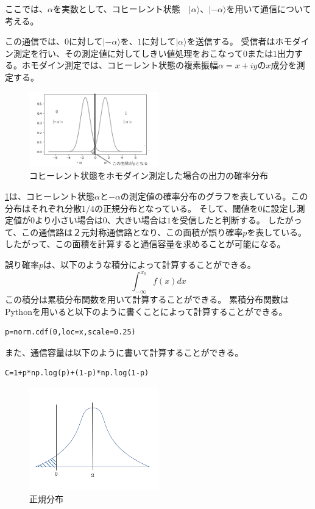 \documentclass[a4j,twocolumn]{jarticle}
\def \figref #1{\figurename\ref{#1}}
\begin{document}
ここでは、$\alpha$を実数として、コヒーレント状態　$|\alpha\rangle$、$|-\alpha\rangle$を用いて通信について考える。

この通信では、$0$に対して$|-\alpha\rangle$を、$1$に対して$|\alpha\rangle$を送信する。
受信者はホモダイン測定を行い、その測定値に対してしきい値処理をおこなって$0$または$1$出力する。ホモダイン測定では、コヒーレント状態の複素振幅$\alpha=x+iy$の$x$成分を測定する。

    \begin{figure}[H]
        \centering   
        \includegraphics[width=0.5\textwidth]{img/Fig3.png}
        \caption[sample image (png)]{コヒーレント状態をホモダイン測定した場合の出力の確率分布}
        \label{Fig4_1}
    \end{figure}




\figref{Fig4_1}は、コヒーレント状態$\alpha$と$-\alpha$の測定値の確率分布のグラフを表している。この分布はそれぞれ分散$1/4$の正規分布となっている。
そして、閾値を$0$に設定し測定値が$0$より小さい場合は$0$、大きい場合は$1$を受信したと判断する。
したがって、この通信路は２元対称通信路となり、この面積が誤り確率$p$を表している。
したがって、この面積を計算すると通信容量を求めることが可能になる。


誤り確率$p$は、以下のような積分によって計算することができる。
$$
\int_{-\infty}^{x_0}f(x)dx
$$この積分は累積分布関数を用いて計算することができる。
累積分布関数はPythonを用いると以下のように書くことによって計算することができる。

\begin{lstlisting}[caption=累積分布関数]
p=norm.cdf(0,loc=x,scale=0.25)
\end{lstlisting}

また、通信容量は以下のように書いて計算することができる。

\begin{lstlisting}[caption=通信容量]
C=1+p*np.log(p)+(1-p)*np.log(1-p)
\end{lstlisting}


    \begin{figure}[H]
        \centering   
        \includegraphics[width=0.5\textwidth]{img/Fig4.png}
         \caption[sample image (png)]{正規分布}
        \label{Fig4_2}
    \end{figure}
\end{document}
